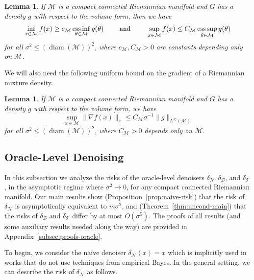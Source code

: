 \documentclass[preprint]{imsart}
\theoremstyle{plain}
\newtheorem{lemma}[theorem]{Lemma}
\theoremstyle{definition}
\newcommand{\Mcal}{\mathcal{M}}
\newcommand{\B}{\mathcal{B}}
\newcommand{\N}{\mathcal{N}}
\newcommand{\T}{\mathcal{T}}
\DeclareMathOperator{\diam}{diam}
\begin{document}
\begin{lemma}\label{lem:f-lower-bd}
    If $\Mcal$ is a compact connected Riemannian manifold and $G$ has a density $g$ with respect to the volume form, then we have 
    \begin{equation*}
        \inf_{x\in\Mcal}f(x)\ge c_{\Mcal}\,\underset{\theta\in\Mcal}{\textnormal{ess}\inf}\,g(\theta)\qquad \textnormal{ and }\qquad\sup_{x\in\Mcal}f(x)\le C_{\Mcal} \,\underset{\theta\in\Mcal}{\textnormal{ess}\sup}\,g(\theta)
    \end{equation*}
    for all $\sigma^2\le(\diam(\Mcal))^2$, where $c_{\Mcal},C_{\Mcal}>0$ are constants depending only on $\Mcal$.
\end{lemma}

We will also need the following uniform bound on the gradient of a Riemannian mixture density.

\begin{lemma}\label{lem:f-diff-1}
    If $\Mcal$ is a compact connected Riemannian manifold and $G$ has a density $g$ with respect to the volume form, we have
    \begin{equation*}
        \sup_{x\in\Mcal}\|\nabla f(x)\|_x \le C_{\Mcal}\sigma^{-1}\|g\|_{L^{\infty}(\Mcal)}
    \end{equation*}
    for all $\sigma^2\le(\diam(\Mcal))^2$, where $C_\Mcal>0$ depends only on $\Mcal$.
\end{lemma}

\subsection{Oracle-Level Denoising}\label{subsec:oracle}

In this subsection we analyze the risks of the oracle-level denoisers $\delta_{\N},\delta_{\B}$, and $\delta_{\T}$, in the asymptotic regime where $\sigma^2\to 0$, for any compact connected Riemannian manifold.
Our main results show (Proposition~\ref{prop:naive-risk}) that the risk of $\delta_{\N}$ is asymptotically equivalent to $m\sigma^2$, and (Theorem~\ref{thm:uncond-main}) that the risks of $\delta_{\B}$ and $\delta_{\T}$ differ by at most $O(\sigma^5)$.
The proofs of all results (and some auxiliary results needed along the way) are provided in Appendix~\ref{subsec:proofs-oracle}.

To begin, we consider the na\"ive denoiser $\delta_{\N}(x) = x$ which is implicitly used in works that do not use techniques from empirical Bayes.
In the general setting, we can describe the risk of $\delta_{\N}$ as follows.
\end{document}
